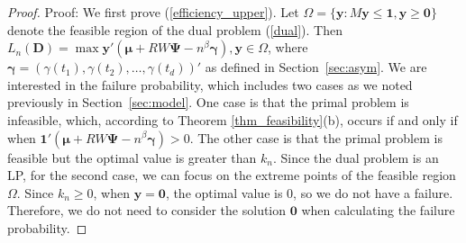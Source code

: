 \documentclass[final,11pt,3p]{article}\usepackage{setspace}
\begin{document}
\begin{proof}{Proof:}
We first prove (\ref{efficiency_upper}).
Let $\Omega = \{\boldsymbol{y}: M\boldsymbol{y} \le \boldsymbol{1},\boldsymbol{y} \ge \boldsymbol{0} \}$ denote the feasible region of the dual problem (\ref{dual}). Then $L_n(\boldsymbol{D}) = \max \boldsymbol{y}' (\boldsymbol{\mu} +  RW\boldsymbol{\Psi} -n^{\beta}\boldsymbol{\gamma}), \boldsymbol{y} \in \Omega $, where $\boldsymbol{\gamma} = (\gamma(t_1), \gamma(t_2), \dots, \gamma(t_d))'$ as defined in Section~\ref{sec:asym}. We are interested in the failure probability, which includes two cases as we noted previously in Section~\ref{sec:model}. One case is that the primal problem is infeasible, which, according to Theorem \ref{thm_feasibility}(b), occurs if and only if when $ \boldsymbol{1}' (\boldsymbol{\mu} +  RW\boldsymbol{\Psi} -n^{\beta}\boldsymbol{\gamma}) > 0$. The other case is that the primal problem is feasible but the optimal value is greater than $k_n$. Since the dual problem is an LP, for the second case, we can focus on the extreme points of the feasible region $\Omega$. Since $k_n \geq 0$, when $\boldsymbol{y} = \boldsymbol{0}$, the optimal value is 0, so we do not have a failure. Therefore, we do not need to consider the solution $\boldsymbol{0}$ when calculating the failure probability.


\end{proof}
\end{document}
